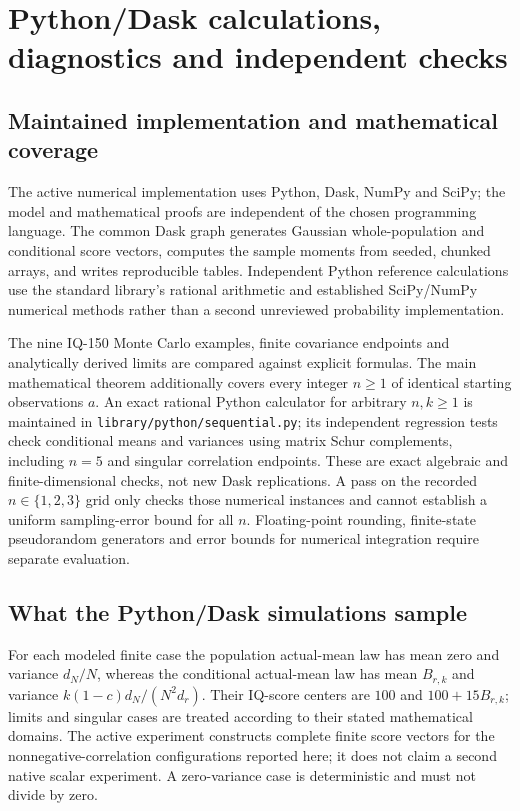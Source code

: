 \chapter{Python/Dask calculations, diagnostics and independent checks}
\label{sec:computational-verification}

\section{Maintained implementation and mathematical coverage}
The active numerical implementation uses Python, Dask, NumPy and SciPy;
the model and mathematical proofs are independent of the chosen
programming language. The common Dask graph generates Gaussian
whole-population and conditional score vectors, computes the sample
moments from seeded, chunked arrays, and writes reproducible tables.
Independent Python reference calculations use the standard library's
rational arithmetic and established SciPy/NumPy numerical methods
rather than a second unreviewed probability implementation.

The nine IQ-150 Monte Carlo examples, finite covariance endpoints and
analytically derived limits are compared against explicit formulas.
The main mathematical theorem additionally covers every integer
\(n\geq1\) of identical starting observations \(a\). An exact rational
Python calculator for arbitrary \(n,k\geq1\) is maintained in
\texttt{library/python/sequential.py}; its independent regression tests
check conditional means and variances using matrix Schur complements,
including \(n=5\) and singular correlation endpoints. These are exact
algebraic and finite-dimensional checks, not new Dask replications.
A pass on the recorded \(n\in\{1,2,3\}\) grid only checks those numerical
instances and cannot establish a uniform sampling-error bound for all \(n\).
Floating-point rounding, finite-state pseudorandom generators and
error bounds for numerical integration require separate evaluation.

\section{What the Python/Dask simulations sample}
For each modeled finite case the population actual-mean law has mean
zero and variance \(d_N/N\), whereas the conditional actual-mean law
has mean \(B_{r,k}\) and variance \(k(1-c)d_N/(N^2d_r)\).
Their IQ-score centers are \(100\) and \(100+15B_{r,k}\);
limits and singular cases are treated according to their stated
mathematical domains. The active experiment constructs complete
finite score vectors for the nonnegative-correlation configurations
reported here; it does not claim a second native scalar experiment.
A zero-variance case is deterministic and must not divide by zero.

